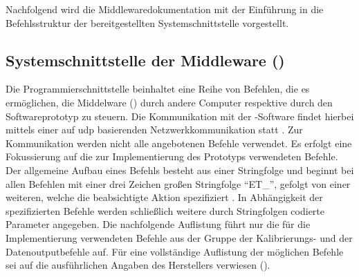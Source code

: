 Nachfolgend wird die Middlewaredokumentation mit der Einführung in die Befehlsstruktur der bereitgestellten Systemschnittstelle vorgestellt.

\subsection{Systemschnittstelle der Middleware (\iV)}
Die Programmierschnittstelle beinhaltet eine Reihe von Befehlen, die es ermöglichen, die Middelware (\iV) durch andere Computer respektive durch den Softwareprototyp zu steuern. Die Kommunikation mit der \iV-Software findet hierbei mittels einer auf \acf{udp} basierenden Netzwerkkommunikation statt \cite[S.439]{SMI2011}. Zur Kommunikation werden nicht alle angebotenen Befehle verwendet. Es erfolgt eine Fokussierung auf die zur Implementierung des Prototyps verwendeten Befehle. Der allgemeine Aufbau eines Befehls besteht aus einer Stringfolge und beginnt bei allen Befehlen mit einer drei Zeichen großen Stringfolge \enquote{ET\_}, gefolgt von einer weiteren, welche die beabsichtigte Aktion spezifiziert \cite[S.484]{SMI2011}\cite{Eidam2015}. In Abhängigkeit der spezifizierten Befehle werden schließlich weitere durch Stringfolgen codierte Parameter angegeben. Die nachfolgende Auflistung führt nur die für die Implementierung verwendeten Befehle aus der Gruppe der Kalibrierungs- und der Datenoutputbefehle auf. Für eine vollständige Auflistung der möglichen Befehle sei auf die ausführlichen Angaben des Herstellers verwiesen (\vgl \cite[484 ff.]{SMI2011}).

